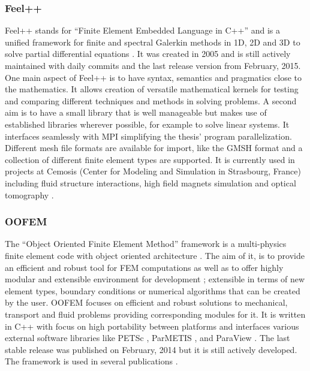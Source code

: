   \subsubsection{Feel++}
  Feel++ stands for ``Finite Element Embedded Language in C++'' and is a unified framework for finite and spectral Galerkin methods in 1D, 2D and 3D to solve partial differential equations \cite{prud2012feel++}. It was created in 2005 and is still actively maintained with daily commits and the last release version from February, 2015. One main aspect of Feel++ is to have syntax, semantics and pragmatics close to the mathematics. It allows creation of versatile mathematical kernels for testing and comparing different techniques and methods in solving problems. A second aim is to have a small library that is well manageable but makes use of established libraries wherever possible, for example to solve linear systems. It interfaces seamlessly with MPI simplifying the thesis' program parallelization. Different mesh file formats are available for import, like the GMSH format and a collection of different finite element types are supported. It is currently used in projects at Cemosis (Center for Modeling and Simulation in Strasbourg, France) including fluid structure interactions, high field magnets simulation and optical tomography \cite{feelpp}.


  \subsubsection{OOFEM}
  The ``Object Oriented Finite Element Method'' framework is a multi-physics finite element code with object oriented architecture \cite{patzak2001design}. The aim of it, is to provide an efficient and robust tool for FEM computations as well as to offer highly modular and extensible environment for development \cite{oofem}; extensible in terms of new element types, boundary conditions or numerical algorithms that can be created by the user. OOFEM focuses on efficient and robust solutions to mechanical, transport and fluid problems providing corresponding modules for it. It is written in C++ with focus on high portability between platforms and interfaces various external software libraries like PETSc \cite{petsc-web-page}, ParMETIS \cite{karypis1998fast}, and ParaView \cite{ahrens2005paraview}. The last stable release was published on February, 2014 but it is still actively developed. The framework is used in several publications \cite{oofemPubs}.
  
  
  

